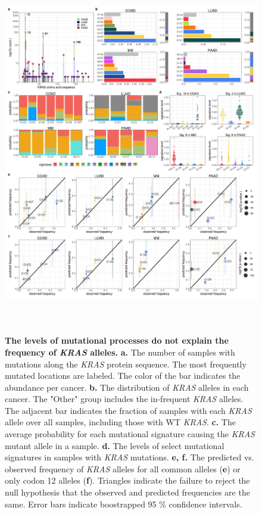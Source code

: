 \documentclass[english, 12pt, letterpaper]{article}
\newcommand{\KRAS}{\emph{KRAS}}
\begin{document}
\begin{figure}[p]
\centering
\includegraphics[height=160mm]{figures/Figure_01.jpeg}
\caption{
    \textbf{The levels of mutational processes do not explain the frequency of \KRAS{} alleles.}
    \textbf{a.} The number of samples with mutations along the \KRAS{} protein sequence. The most frequently mutated locations are labeled. The color of the bar indicates the abundance per cancer. 
    \textbf{b.} The distribution of \KRAS{} alleles in each cancer. The "Other" group includes the in-frequent \KRAS{} alleles. The adjacent bar indicates the fraction of samples with each \KRAS{} allele over all samples, including those with WT \KRAS{}.
    \textbf{c.} The average probability for each mutational signature causing the \KRAS{} mutant allele in a sample.
    \textbf{d.} The levels of select mutational signatures in samples with \KRAS{} mutations.
    \textbf{e, f.} The predicted vs. observed frequency of \KRAS{} alleles for all common alleles (\textbf{e}) or only codon 12 alleles (\textbf{f}). Triangles indicate the failure to reject the null hypothesis that the observed and predicted frequencies are the same. Error bars indicate boostrapped 95 \% confidence intervals.
    }
    \label{fig:mutational-signatures-main}
\end{figure}
\end{document}
